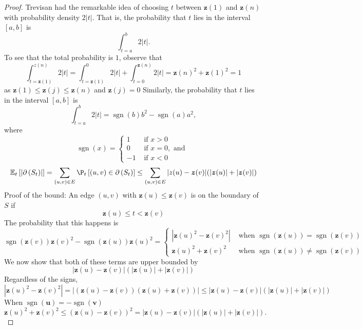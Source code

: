 \documentclass{article}
\newcommand{\bsl}[1]{\boldsymbol{#1}}
\begin{document}
\begin{proof}
Trevisan had the remarkable idea of choosing $t$ between $\boldsymbol{z}(1)$ and $\boldsymbol{z}(n)$ with probability density $2|t| .$ That is, the probability that $t$ lies in the interval $[a, b]$ is
$$
\int_{t=a}^{b} 2|t| .
$$
To see that the total probability is $1$, observe that
$$
\int_{t=\bsl{z}(1)}^{z(n)} 2|t|=\int_{t=\bsl{z}(1)}^{0} 2|t|+\int_{t=0}^{\bsl{z}(n)} 2|t|=\boldsymbol{z}(n)^{2}+\boldsymbol{z}(1)^{2}=1
$$
as $\boldsymbol{z}(1) \leq \boldsymbol{z}(j) \leq \boldsymbol{z}(n)$ and $\boldsymbol{z}(j)=0$
Similarly, the probability that $t$ lies in the interval $[a, b]$ is
$$
\int_{t=a}^{b} 2|t|=\operatorname{sgn}(b) b^{2}-\operatorname{sgn}(a) a^{2},
$$
where
$$
\operatorname{sgn}(x)=\left\{\begin{array}{ll}
1 & \text { if } x>0 \\
0 & \text { if } x=0, \text { and } \\
-1 & \text { if } x<0
\end{array}\right.
$$
\begin{align}
 \mathbb{E}_{t}\left[\left|\partial\left(S_{t}\right)\right|\right]=\sum_{(u, v) \in E} \P_{t}\left[(u, v) \in \partial\left(S_{t}\right)\right] \leq \sum_{(u, v) \in E}|z(u)-\boldsymbol{z}(v)|(|\boldsymbol{z}(u)|+|\boldsymbol{z}(v)|)   \label{eq:dd1}
\end{align}
Proof of the bound: An edge $(u, v)$ with $\boldsymbol{z}(u) \leq \boldsymbol{z}(v)$ is on the boundary of $S$ if
$$
\boldsymbol{z}(u) \leq t<\boldsymbol{z}(v)
$$
The probability that this happens is
$$
\operatorname{sgn}(\boldsymbol{z}(v)) \boldsymbol{z}(v)^{2}-\operatorname{sgn}(\boldsymbol{z}(u)) \boldsymbol{z}(u)^{2}=\left\{\begin{array}{ll}
\left|\boldsymbol{z}(u)^{2}-\boldsymbol{z}(v)^{2}\right| & \text { when } \operatorname{sgn}(\bsl{z}(u))=\operatorname{sgn}(\bsl{z}(v)) \\
\boldsymbol{z}(u)^{2}+\boldsymbol{z}(v)^{2} & \text { when } \operatorname{sgn}(\bsl{z}(u)) \neq \operatorname{sgn}(\bsl{z}(v))
\end{array}\right.
$$
We now show that both of these terms are upper bounded by
$$
|\boldsymbol{z}(u)-\boldsymbol{z}(v)|(|\boldsymbol{z}(u)|+|\boldsymbol{z}(v)|)
$$
Regardless of the signs,
$$
\left|\boldsymbol{z}(u)^{2}-\boldsymbol{z}(v)^{2}\right|=|(\boldsymbol{z}(u)-\boldsymbol{z}(v))(\boldsymbol{z}(u)+\boldsymbol{z}(v))| \leq|\boldsymbol{z}(u)-\boldsymbol{z}(v)|(|\boldsymbol{z}(u)|+|\boldsymbol{z}(v)|)
$$
When $\operatorname{sgn}(\bsl{u})=-\operatorname{sgn}(\bsl{v})$
$$
\boldsymbol{z}(u)^{2}+\boldsymbol{z}(v)^{2} \leq(\boldsymbol{z}(u)-\boldsymbol{z}(v))^{2}=|\boldsymbol{z}(u)-\boldsymbol{z}(v)|(|\boldsymbol{z}(u)|+|\boldsymbol{z}(v)|) .
$$


\end{proof}
\end{document}

